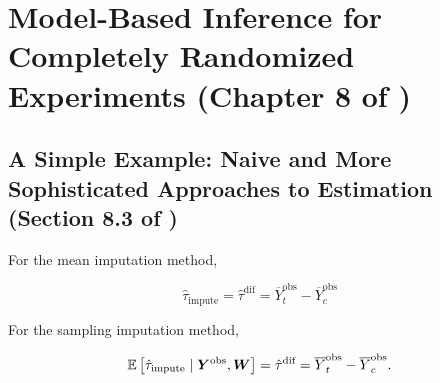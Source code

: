 \section{Model-Based Inference for Completely Randomized Experiments (Chapter 8 of \citet{imbens_rubin_2015})}

\subsection{A Simple Example: Naive and More Sophisticated Approaches to Estimation (Section 8.3 of \citet{imbens_rubin_2015})}

\begin{theorem}

For the mean imputation method,

\[
\hat{\tau}_{\text{impute}} = \hat{\tau}^{\text{dif}} = \overline{Y}_t^{\text{obs}} -  \overline{Y}_c^{\text{obs}}
\]

For the sampling imputation method,

\[
\E\left[ \hat{\tau}_{\text{impute}} \mid \boldsymbol{Y}^{\text{obs}}, \boldsymbol{W} \right] = \hat{\tau}^{\text{dif}} = \overline{Y}_t^{\text{obs}} -  \overline{Y}_c^{\text{obs}}.
\]

\end{theorem}

